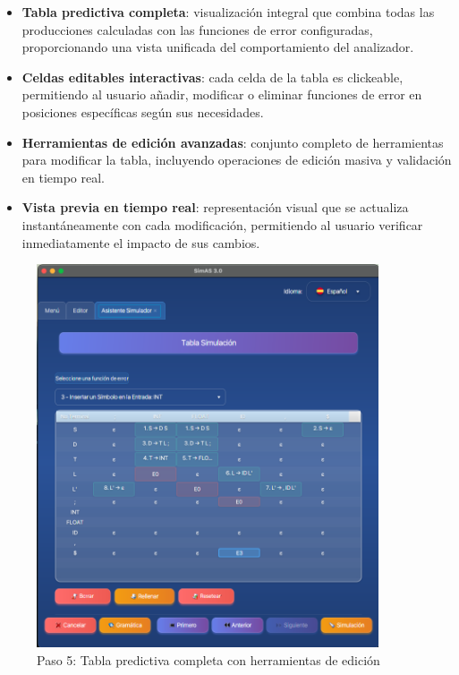 \begin{itemize}
    \item \textbf{Tabla predictiva completa}: visualización integral que combina todas las producciones calculadas con las funciones de error configuradas, proporcionando una vista unificada del comportamiento del analizador.
    \item \textbf{Celdas editables interactivas}: cada celda de la tabla es clickeable, permitiendo al usuario añadir, modificar o eliminar funciones de error en posiciones específicas según sus necesidades.
    \item \textbf{Herramientas de edición avanzadas}: conjunto completo de herramientas para modificar la tabla, incluyendo operaciones de edición masiva y validación en tiempo real.
    \item \textbf{Vista previa en tiempo real}: representación visual que se actualiza instantáneamente con cada modificación, permitiendo al usuario verificar inmediatamente el impacto de sus cambios.
\end{itemize}

\needspace{8cm}
\begin{figure}[H]
    \centering
    \includegraphics[width=0.9\textwidth]{figuras/simulador/paso5_tablaPredictivaCompleta.png}
    \caption{Paso 5: Tabla predictiva completa con herramientas de edición}
    \label{fig:paso5_tabla_completa}
\end{figure}

